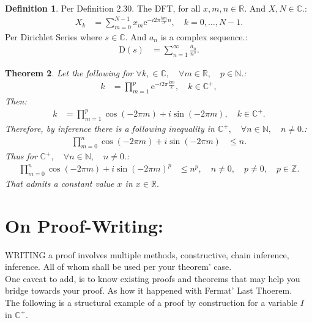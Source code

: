 \documentclass[10pt]{article}
\theoremstyle{plain}
\newtheorem{theorem}{Theorem}[section]
\theoremstyle{definition}
\newtheorem{definition}[theorem]{Definition}
\theoremstyle{remark}
\begin{document}
\begin{definition}
	Per Definition 2.30. The DFT, for all $x, m, n \in \mathbb{R}.$ And  $X, N \in \mathbb{C}.$:
	\begin{align*}
		X_k &= \sum_{m=0}^{N-1} x_{m}\mathrm{e}^{-i2\pi \frac{km}{N}n}, \quad k = 0,\dots,N-1.
	\end{align*}
	Per Dirichlet Series where $s \in \mathbb{C}.$ And $a_{n}$ is a complex sequence.:
	\begin{align*}
		\mathrm{D}(s) &= \sum_{n=1}^{\infty} \frac{a_{n}}{n^{s}}.
	\end{align*}
\end{definition}

\begin{theorem}
	Let the following for $\forall k, \in \mathbb{C}, \quad \forall m \in \mathbb{R}, \quad p \in \mathbb{N}.$:
	\begin{align*}
		k &= \prod_{m=1}^{p} \mathrm{e}^{-i2\pi \frac{km}{k}}, \quad k \in \mathbb{C}^{+},
	\end{align*}
	Then:
	\begin{align*}
		k &= \prod_{m=1}^{p} \cos (-2\pi m) + i \sin (-2\pi m), \quad k \in \mathbb{C}^{+}.
	\end{align*}
	Therefore, by inference there is a following inequality in $\mathbb{C}^{+}, \quad \forall n \in \mathbb{N}, \quad n \neq 0.$:
	\begin{align*}
		\prod_{m=0}^{n} \cos (-2\pi m) + i \sin (-2\pi m) &\leq n.
	\end{align*}
	Thus for $\mathbb{C}^{+}, \quad \forall n \in \mathbb{N}, \quad n \neq 0.$:
	\begin{align*}
		\prod_{m=0}^{n} \cos (-2\pi m) + i \sin (-2\pi m)^{p} &\leq n^{p}, \quad n \neq 0, \quad p \neq 0, \quad p \in \mathbb{Z}.
	\end{align*}
	That admits a constant value $x$ in $x \in \mathbb{R}$.
\end{theorem}

\section{On Proof-Writing:}

\lettrine[lines=2, lhang=0.1, loversize=0.2]{W}RITING a proof involves multiple methods, constructive, chain inference, inference. All of whom shall be used per your theorem' case.\\
One caveat to add, is to know existing proofs and theorems that may help you bridge towards your proof. As how it happened with Fermat' Last Thoerem.\\
The following is a structural example of a proof by construction for a variable $I$ in $\mathbb{C}^{+}.$
\end{document}
